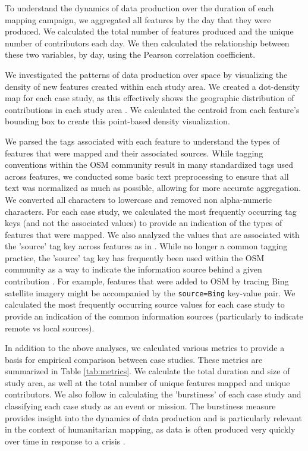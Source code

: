 To understand the dynamics of data production over the duration of each mapping campaign, we aggregated all features by the day that they were produced. We calculated the total number of features produced and the unique number of contributors each day. We then calculated the relationship between these two variables, by day, using the Pearson correlation coefficient. 

We investigated the patterns of data production over space by visualizing the density of new features created within each study area. We created a dot-density map for each case study, as this effectively shows the geographic distribution of contributions in each study area \parencite{kimerling_dotting_2009}. We calculated the centroid from each feature's bounding box to create this point-based density visualization. 

We parsed the tags associated with each feature to understand the types of features that were mapped and their associated sources. While tagging conventions within the OSM community result in many standardized tags used across features, we conducted some basic text preprocessing to ensure that all text was normalized as much as possible, allowing for more accurate aggregation. We converted all characters to lowercase and removed non alpha-numeric characters. For each case study, we calculated the most frequently occurring tag keys (and not the associated values) to provide an indication of the types of features that were mapped. We also analyzed the values that are associated with the 'source' tag key across features as in \textcite{ahmouda_analyzing_2018}. While no longer a common tagging practice, the 'source' tag key has frequently been used within the OSM community as a way to indicate the information source behind a given contribution \parencite{noauthor_keysource_2020}. For example, features that were added to OSM by tracing Bing satellite imagery might be accompanied by the \texttt{source=Bing} key-value pair. We calculated the most frequently occurring source values for each case study to provide an indication of the common information sources (particularly to indicate remote vs local sources). 

In addition to the above analyses, we calculated various metrics to provide a basis for empirical comparison between case studies. These metrics are summarized in Table \ref{tab:metrics}. We calculate the total duration and size of study area, as well at the total number of unique features mapped and unique contributors. We also follow \textcite{dittus_mass_2017} in calculating the 'burstiness' of each case study and classifying each case study as an event or mission. The burstiness measure provides insight into the dynamics of data production and is particularly relevant in the context of humanitarian mapping, as data is often produced very quickly over time in response to a crisis \parencite{dittus_mass_2017}. 


